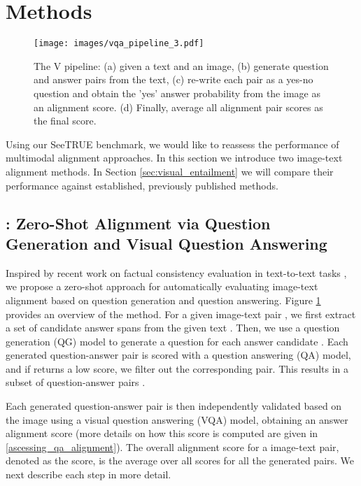 \documentclass{article}
\newcommand{\datasetname}[0]{SeeTRUE\xspace}
\begin{document}
\section{Methods}
\label{sec:method}
\begin{figure}[!t]
    \centering
    \texttt{[image: images/vqa\_pipeline\_3.pdf]}\\
    \vspace{-10px}
    \caption{The V pipeline: (a) given a text and an image, (b) generate question and answer pairs from the text, (c)  re-write each pair as a yes-no question and obtain the 'yes' answer probability from the image as an alignment score. (d) Finally, average all alignment pair scores as the final  score.
    }
    \vspace{-10px}
    \label{fig:fig_zeroshot_method}
\end{figure}
 Using our \datasetname benchmark, we would like to reassess the performance of multimodal alignment approaches. In this section we introduce two image-text alignment methods. In Section \ref{sec:visual_entailment} we will compare their performance against established, previously published methods.

\subsection{\texorpdfstring{: Zero-Shot Alignment via Question Generation and Visual Question Answering}{VQ2: Zero-Shot Alignment via Question Generation and Visual Question Answering}}


Inspired by recent work on factual consistency evaluation in text-to-text tasks \citep{wang-etal-2020-asking, honovich2021q, scialom-etal-2021-questeval}, we propose a zero-shot approach for automatically evaluating image-text alignment based on question generation and question answering. Figure \ref{fig:fig_zeroshot_method} provides an overview of the method.
For a given image-text pair , we first extract a set of candidate answer spans  from the given text . 
Then, we use a question generation (QG) model to generate a question for each answer candidate . 
Each generated question-answer pair  is scored with a question answering (QA) model, and if  returns a low score, we filter out the corresponding pair.
This results in a subset of  question-answer pairs . 

Each generated question-answer pair  is then independently validated based on the image  using a visual question answering (VQA) model, obtaining an answer alignment score  (more details on how this score is computed are given in \ref{ascessing_qa_alignment}).
The overall alignment score for a image-text pair, denoted as the  score, is the average over all  scores for all the generated  pairs.
 We next describe each step in more detail.
\end{document}
